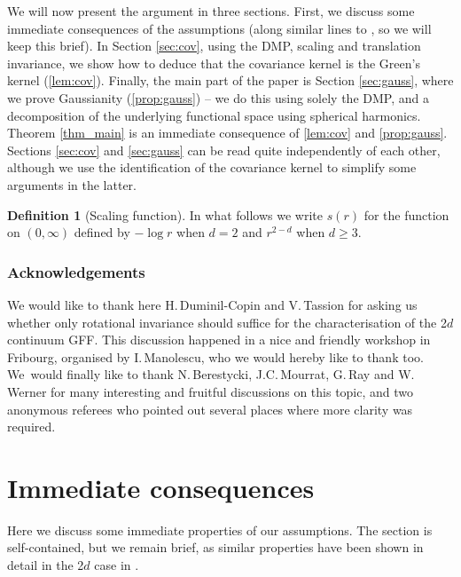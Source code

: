 \documentclass[JEP,XML,SOM,Unicode,published]{cedram}
\theoremstyle{definition}
\newtheorem{definition}[theorem]{Definition}
\begin{document}
We will now present the argument in three sections. First, we discuss some immediate consequences of the assumptions (along similar lines to \cite{BPR18}, so we will keep this brief). In Section \ref{sec:cov}, using the DMP, scaling and translation invariance, we show how to deduce that the covariance kernel is the Green's kernel (\cref{lem:cov}). Finally, the main part of the paper is Section \ref{sec:gauss}, where we prove Gaussianity (\cref{prop:gauss}) -- we do this using solely the DMP, and a decomposition of the underlying functional space using spherical harmonics. Theorem \ref{thm_main} is an immediate consequence of \cref{lem:cov} and \cref{prop:gauss}. Sections \ref{sec:cov} and \ref{sec:gauss} can be read quite independently of each other, although we use the identification of the covariance kernel to simplify some arguments in the latter.

\begin{definition}[Scaling function]\label{def:s}
In what follows we write $s(r)$ for the function on $(0,\infty)$ defined by $-\log r$ when $d=2$ and $r^{2-d}$ when $d\ge 3$.
\end{definition}

\subsubsection*{Acknowledgements}
We would like to thank here H.\,Duminil-Copin and V.\,Tassion for asking us whether only rotational invariance should suffice for the characterisation of the 2$d$ continuum GFF. This discussion happened in a nice and friendly workshop in Fribourg, organised by I.\,Manolescu, who we would hereby like to thank too. We~would finally like to thank N.\,Berestycki, J.C.\,Mourrat, G.\,Ray and W.\,Werner for many interesting and fruitful discussions on this topic, and two anonymous referees who pointed out several places where more clarity was required.

\section{Immediate consequences}\label{sec:immediate_consequences}

{Here we discuss some immediate properties of our assumptions. The section is self-contained, but we remain brief, as similar properties have been shown in detail in the 2$d$ case in \cite{BPR18}.}
\end{document}

